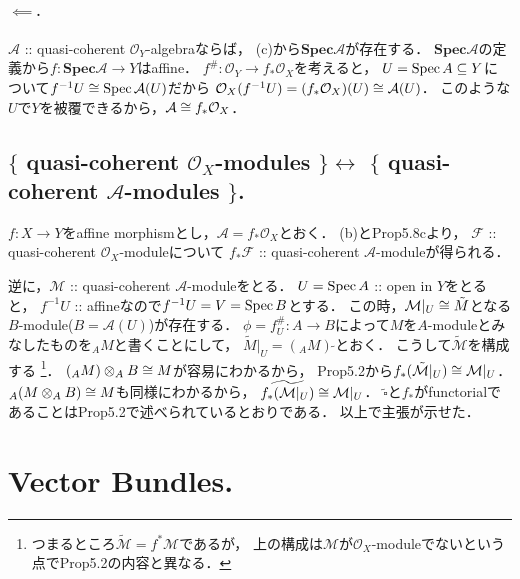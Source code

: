 \documentclass[a4paper]{jsarticle}
\newcommand{\shA}{\mathcal{A}}
\newcommand{\shF}{\mathcal{F}}
\newcommand{\shO}{\mathcal{O}}
\newcommand{\shM}{\mathcal{M}}
\newcommand{\bfSpec}{\mathbf{Spec}}
\newcommand{\sidetilde}{\,\tilde{}}
\begin{document}
    \paragraph{$\impliedby$.}
    $\shA$ :: quasi-coherent $\shO_Y$-algebraならば，
    (c)から$\bfSpec \shA$が存在する．
    $\bfSpec \shA$の定義から$f: \bfSpec \shA \to Y$はaffine．
    $f^{\#}: \shO_Y \to f_*\shO_X$を考えると，
    $U=\operatorname{Spec} A \subseteq Y$について$f^{-1}U \iso \Spec \shA(U)$だから
    $\shO_X(f^{-1}U)=(f_*\shO_X)(U) \iso \shA(U)$．
    このような$U$で$Y$を被覆できるから，$\shA \iso f_*\shO_X$．

    \subsection{$\{$ quasi-coherent $\shO_X$-modules $\} \leftrightarrow$ $\{$ quasi-coherent $\shA$-modules $\}$.}
    $f: X \to Y$をaffine morphismとし，$\shA=f_*\shO_X$とおく．
    (b)とProp5.8cより，
    $\shF$ :: quasi-coherent $\shO_X$-moduleについて
    $f_* \shF$ :: quasi-coherent $\shA$-moduleが得られる．

    逆に，$\shM$ :: quasi-coherent $\shA$-moduleをとる．
    $U=\operatorname{Spec} A$ :: open in $Y$をとると，
    $f^{-1}U$ :: affineなので$f^{-1}U=V=\operatorname{Spec} B$とする．
    この時，$\shM|_U \iso \tilde{M}$となる$B$-module($B=\shA(U)$)が存在する．
    $\phi=f^{\#}_U: A \to B$によって$M$を$A$-moduleとみなしたものを${}_A M$と書くことにして，
    $\tilde{M}|_U=({}_A M)\sidetilde$とおく．
    こうして$\tilde{\shM}$を構成する
    \footnote
    {
        つまるところ$\tilde{\shM}=f^* \shM$であるが，
        上の構成は$\shM$が$\shO_X$-moduleでないという点でProp5.2の内容と異なる．
    }．
    $({}_A M) \otimes_A B \cong M$が容易にわかるから，
    Prop5.2から$f_*(\tilde{\shM}|_U) \iso \shM|_U$．
    ${}_A(M \otimes_A B) \cong M$も同様にわかるから，
    $\widetilde{f_*(\shM|_U)} \iso \shM|_U$．
    $\tilde{\square}$と$f_*$がfunctorialであることはProp5.2で述べられているとおりである．
    以上で主張が示せた．

\section{Vector Bundles.} %
\end{document}
